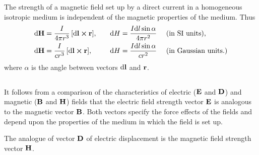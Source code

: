 The strength of a magnetic field set up by a direct current in a homogeneous isotropic medium is independent of the magnetic properties of the medium. Thus
\begin{alignat*}{3}%
\dd \vb{H} & = \frac{I}{4 \pi r^{3}}\, [\dd \vb{l} \cross \vb{r}], \quad  && \dd H  = \frac{I \dd l \sin \alpha}{4 \pi r^{2}} \,\, && \text{(in SI units),} \\
\dd \vb{H} & =  \frac{I}{c r^{3}}\, [\dd \vb{l} \cross \vb{r}], \quad && \dd H  = \frac{I \dd l \sin \alpha}{c r^{2}} \,\,&& \text{(in Gaussian units.)}
\end{alignat*}
where $\alpha$ is the angle between vectors $\dd \vb{l}$ and $\vb{r}$.

\subsection{}\label{23.2.4} It follows from a comparison of the characteristics of electric ($\vb{E}$ and $\vb{D}$) and magnetic ($\vb{B}$ and $\vb{H}$) fields that the electric field strength vector $\vb{E}$ is analogous to the magnetic vector $\vb{B}$. Both vectors specify the force effects of the fields and depend upon the properties of the medium in which the field is set up.

The analogue of vector $\vb{D}$ of electric displacement  is the magnetic field strength vector $\vb{H}$.

